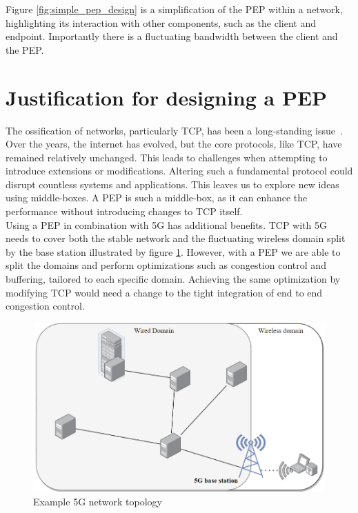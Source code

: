 \documentclass[a4paper,english, 12pt]{report}
\begin{document}
Figure \ref{fig:simple_pep_design} is a simplification of the PEP within a network, highlighting its interaction with other components, such as the client and endpoint. Importantly there is a fluctuating bandwidth between the client and the PEP.

\section{Justification for designing a PEP}
The ossification of networks, particularly TCP, has been a long-standing issue~\cite{tcp_extendable}. Over the years, the internet has evolved, but the core protocols, like TCP, have remained relatively unchanged. This leads to challenges when attempting to introduce extensions or modifications. Altering such a fundamental protocol could disrupt countless systems and applications. This leaves us to explore new ideas using middle-boxes. A PEP is such a middle-box, as it can enhance the performance without introducing changes to TCP itself.\\

Using a PEP in combination with 5G has additional benefits. TCP with 5G needs to cover both the stable network and the fluctuating wireless domain split by the base station illustrated by figure \ref{fig:5g_topology}. However, with a PEP we are able to split the domains and perform optimizations such as congestion control and buffering, tailored to each specific domain. Achieving the same optimization by modifying TCP would need a change to the tight integration of end to end congestion control.\\

\begin{figure}[h!] %
	\centering
	\includegraphics[scale=0.6]{../diagrams/drawio/deployment_without_pep.png}
  	\caption{Example 5G network topology}
  	\label{fig:5g_topology}
\end{figure}
\end{document}
